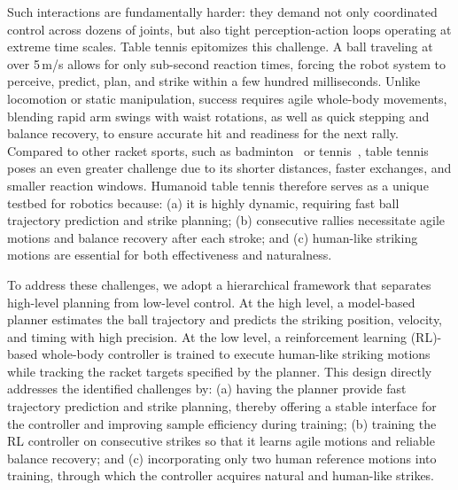 Such interactions are fundamentally harder: they demand not only coordinated control across dozens of joints, but also tight perception-action loops operating at extreme time scales. Table tennis epitomizes this challenge. A ball traveling at over 5\,m/s allows for only sub-second reaction times, forcing the robot system to perceive, predict, plan, and strike within a few hundred milliseconds. Unlike locomotion or static manipulation, success requires agile whole-body movements, blending rapid arm swings with waist rotations, as well as quick stepping and balance recovery, to ensure accurate hit and readiness for the next rally. Compared to other racket sports, such as badminton~\cite{ma2025learning} or tennis~\cite{zaidi2023athletic}, table tennis poses an even greater challenge due to its shorter distances, faster exchanges, and smaller reaction windows. Humanoid table tennis therefore serves as a unique testbed for robotics because:
(a) it is highly dynamic, requiring fast ball trajectory prediction and strike planning;
(b) consecutive rallies necessitate agile motions and balance recovery after each stroke; and
(c) human-like striking motions are essential for both effectiveness and naturalness.

To address these challenges, we adopt a hierarchical framework that separates high-level planning from low-level control. At the high level, a model-based planner estimates the ball trajectory and predicts the striking position, velocity, and timing with high precision. At the low level, a reinforcement learning (RL)-based whole-body controller is trained to execute human-like striking motions while tracking the racket targets specified by the planner. This design directly addresses the identified challenges by: (a) having the planner provide fast trajectory prediction and strike planning, thereby offering a stable interface for the controller and improving sample efficiency during training; (b) training the RL controller on consecutive strikes so that it learns agile motions and reliable balance recovery; and (c) incorporating only two human reference motions into training, through which the controller acquires natural and human-like strikes.

